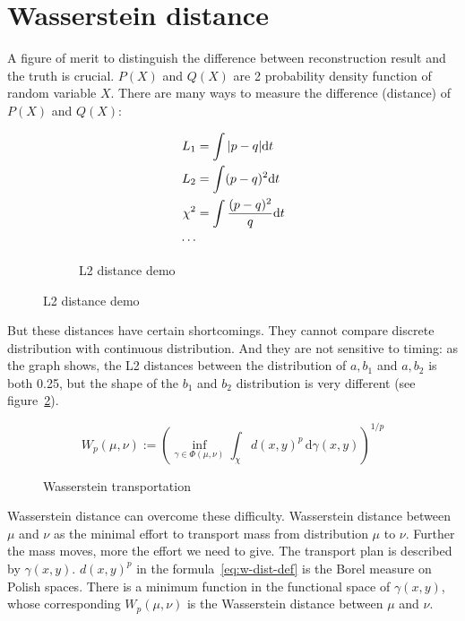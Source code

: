 \section{Wasserstein distance} %
A figure of merit to distinguish the difference between reconstruction result and the truth is crucial. $P(X)$ and $Q(X)$ are 2 probability density function of random variable $X$. There are many ways to measure the difference (distance) of $P(X)$ and $Q(X)$: 

\begin{figure}[H]
\begin{minipage}{.25\textwidth}
\begin{align*}
    L_{1} &= \int|p-q| \mathrm{d} t \\
    L_{2} &= \int(p-q)^{2} \mathrm{d} t \\
    \chi^{2} &= \int\frac{(p-q)^{2}}{q} \mathrm{d} t \\
    \cdots
\end{align*}
\end{minipage}
\begin{minipage}{.7\textwidth}
\begin{figure}[H]
    \centering
    \scalebox{0.4}{}
    \caption{\label{fig:l2} L2 distance demo}
\end{figure}
\end{minipage}
\end{figure}

But these distances have certain shortcomings. They cannot compare discrete distribution with continuous distribution. And they are not sensitive to timing: as the graph shows, the L2 distances between the distribution of $a,b_{1}$ and $a,b_{2}$ is both 0.25, but the shape of the $b_{1}$ and $b_{2}$ distribution is very different (see figure~\ref{fig:l2}). 

\label{sub:Wasserstein distance}
    \begin{equation}
        W_{p}(\mu,\nu):=\left(\inf_{\gamma\in\Phi(\mu,\nu)}\int_{\chi}d(x,y)^{p}\,\mathrm{d}\gamma(x,y)\right)^{1/p} \label{eq:w-dist-def}
    \end{equation}
    \begin{figure}[H]
        \centering
        \scalebox{0.4}{}
        \caption{\label{fig:Wasserstein transportation} Wasserstein transportation}
    \end{figure}

Wasserstein distance can overcome these difficulty. Wasserstein distance between $\mu$ and $\nu$ as the minimal effort to transport mass from distribution $\mu$ to $\nu$. Further the mass moves, more the effort we need to give. The transport plan is described by $\gamma(x, y)$. $d(x,y)^{p}$ in the formula~\eqref{eq:w-dist-def} is the Borel measure on Polish spaces\cite{villani_2009}. There is a minimum function in the functional space of $\gamma(x, y)$, whose corresponding $W_{p}(\mu ,\nu)$ is the Wasserstein distance between $\mu$ and $\nu$. 

